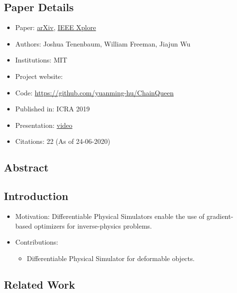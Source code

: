 \documentclass{article}
\begin{document}
    \subsection*{Paper Details}
    \begin{itemize}
        \item Paper: \href{https://arxiv.org/abs/1810.01054}{arXiv}, \href{https://ieeexplore.ieee.org/abstract/document/8794333}{IEEE Xplore}
        \item Authors: Joshua Tenenbaum, William Freeman, Jiajun Wu
        \item Institutions: MIT
        \item Project website:
        \item Code: \url{https://github.com/yuanming-hu/ChainQueen}
        \item Published in: ICRA 2019
        \item Presentation: \href{https://www.youtube.com/watch?v=4IWD4iGIsB4}{video}
        \item Citations: 22 (As of 24-06-2020)
    \end{itemize}

    \subsection*{Abstract}

    \subsection{Introduction}\label{subsec:ChainQueen_A_Real_Time_Differentiable_Physical_Simulator_for_Soft_Robotics:introduction}
    \begin{itemize}
        \item Motivation: Differentiable Physical Simulators enable the use of gradient-based optimizers for inverse-physics problems.
        \item Contributions:
        \begin{itemize}
            \item Differentiable Physical Simulator for deformable objects.
        \end{itemize}
    \end{itemize}

    \subsection{Related Work}\label{subsec:ChainQueen_A_Real_Time_Differentiable_Physical_Simulator_for_Soft_Robotics:related-work}
\end{document}
